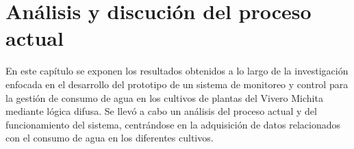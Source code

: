 \section{Análisis y discución del proceso actual}

En este capítulo se exponen los resultados obtenidos a lo largo de la investigación enfocada en el desarrollo del prototipo de un sistema de monitoreo y control para la gestión de consumo de agua en los cultivos de plantas del Vivero Michita mediante lógica difusa. Se llevó a cabo un análisis del proceso actual y del funcionamiento del sistema, centrándose en la adquisición de datos relacionados con el consumo de agua en los diferentes cultivos.




